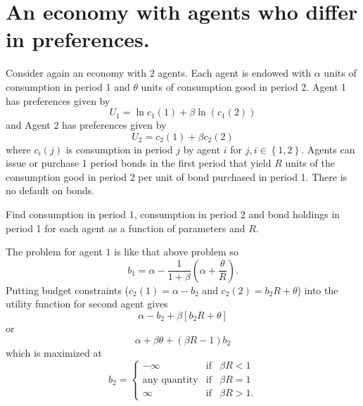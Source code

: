 \documentclass{sebase}
\begin{document}
\pagebreak

\section{An economy with agents who differ in preferences.}

Consider again an economy with 2 agents. Each agent is endowed with $\alpha $
units of consumption in period 1 and $\theta $ units of consumption good in
period 2. Agent 1 has preferences given by 
\begin{equation*}
U_{1}=\ln c_{1}\left( 1\right) +\beta \ln \left( c_{1}\left( 2\right) \right)
\end{equation*}%
and Agent 2 has preferences given by 
\begin{equation*}
U_{2}=c_{2}\left( 1\right) +\beta c_{2}\left( 2\right)
\end{equation*}%
where $c_{i}\left( j\right) $ is consumption in period $j$ by agent $i$ for $%
j,i\in \left\{ 1,2\right\} .$ Agents can issue or purchase 1 period bonds in
the first period that yield $R$ units of the consumption good in period 2
per unit of bond purchased in period 1. There is no default on bonds.

Find consumption in period 1, consumption in period 2 and bond holdings in
period 1 for each agent as a function of parameters and $R.$\newline
\pagebreak

The problem for agent $1$ is like that above problem so 
\begin{equation}
b_{1}=\alpha -\frac{1}{1+\beta }\left( \alpha +\frac{\theta }{R}\right) .
\label{bond1}
\end{equation}%
\newline
Putting budget constraints ($c_{2}\left( 1\right) =\alpha -b_{2}$ and $%
c_{2}\left( 2\right) =b_{2}R+\theta $) into the utility function for second
agent gives 
\begin{equation*}
\alpha -b_{2}+\beta \left[ b_{2}R+\theta \right]
\end{equation*}%
or 
\begin{equation*}
\alpha +\beta \theta +\left( \beta R-1\right) b_{2}
\end{equation*}%
which is maximized at%
\begin{equation*}
b_{2}=\left\{ 
\begin{array}{ccc}
-\infty & \text{if} & \beta R<1 \\ 
\text{any quantity} & \text{if} & \beta R=1 \\ 
\infty & \text{if} & \beta R>1.%
\end{array}%
\right.
\end{equation*}
\end{document}
